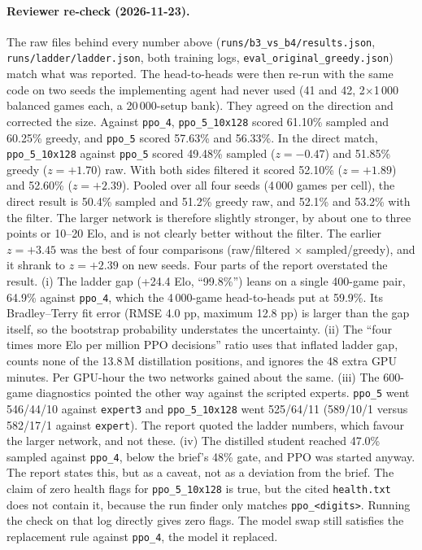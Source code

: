 \paragraph{Reviewer re-check (2026-11-23).} The raw files behind every number above
(\texttt{runs/b3\_vs\_b4/results.json}, \texttt{runs/ladder/ladder.json}, both training logs,
\texttt{eval\_original\_greedy.json}) match what was reported. The head-to-heads were then
re-run with the same code on two seeds the implementing agent had never used (41 and 42,
2$\times$1\,000 balanced games each, a 20\,000-setup bank). They agreed on the
direction and corrected the size. Against \texttt{ppo\_4}, \texttt{ppo\_5\_10x128} scored
61.10\% sampled and 60.25\% greedy, and \texttt{ppo\_5} scored 57.63\% and 56.33\%. In the direct
match, \texttt{ppo\_5\_10x128} against \texttt{ppo\_5} scored 49.48\% sampled ($z=-0.47$) and
51.85\% greedy ($z=+1.70$) raw. With both sides filtered it scored 52.10\% ($z=+1.89$) and 52.60\%
($z=+2.39$). Pooled over all four seeds (4\,000 games per cell), the direct result is 50.4\%
sampled and 51.2\% greedy raw, and 52.1\% and 53.2\% with the filter. The larger network is
therefore slightly stronger, by about one to three points or 10--20 Elo, and is not clearly
better without the filter. The earlier $z=+3.45$ was the best of four comparisons
(raw/filtered $\times$ sampled/greedy), and it shrank to $z=+2.39$ on new seeds. Four parts of the
report overstated the result.
(i) The ladder gap (+24.4 Elo, ``99.8\%'') leans on a single 400-game pair, 64.9\% against
\texttt{ppo\_4}, which the 4\,000-game head-to-heads put at 59.9\%. Its Bradley--Terry fit
error (RMSE 4.0 pp, maximum 12.8 pp) is larger than the gap itself, so the bootstrap probability
understates the uncertainty.
(ii) The ``four times more Elo per million PPO decisions'' ratio uses that inflated ladder
gap, counts none of the 13.8\,M distillation positions, and ignores the 48 extra GPU minutes.
Per GPU-hour the two networks gained about the same.
(iii) The 600-game diagnostics pointed the other way against the scripted experts.
\texttt{ppo\_5} went 546/44/10 against \texttt{expert3} and \texttt{ppo\_5\_10x128} went 525/64/11
(589/10/1 versus 582/17/1 against \texttt{expert}). The report quoted the ladder numbers, which
favour the larger network, and not these.
(iv) The distilled student reached 47.0\% sampled against \texttt{ppo\_4}, below the brief's
48\% gate, and PPO was started anyway. The report states this, but as a caveat, not as a
deviation from the brief.
The claim of zero health flags for \texttt{ppo\_5\_10x128} is true, but the cited
\texttt{health.txt} does not contain it, because the run finder only matches \texttt{ppo\_<digits>}.
Running the check on that log directly gives zero flags. The model swap still satisfies the
replacement rule against \texttt{ppo\_4}, the model it replaced.

